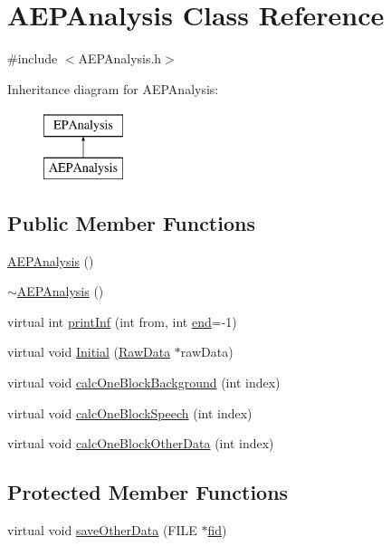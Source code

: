 \hypertarget{class_a_e_p_analysis}{\section{A\+E\+P\+Analysis Class Reference}
\label{class_a_e_p_analysis}
}


{\ttfamily \#include $<$A\+E\+P\+Analysis.\+h$>$}

Inheritance diagram for A\+E\+P\+Analysis\+:\begin{figure}[H]
\begin{center}
\leavevmode
\includegraphics[height=2.000000cm]{class_a_e_p_analysis}
\end{center}
\end{figure}
\subsection*{Public Member Functions}
\begin{DoxyCompactItemize}
\item 
\hyperlink{class_a_e_p_analysis_abfb2164f3ed7f023c2172b9bcf8b1e23}{A\+E\+P\+Analysis} ()
\item 
\hyperlink{class_a_e_p_analysis_a9bed164d77fe6f0acfdc941b361ea56a}{$\sim$\+A\+E\+P\+Analysis} ()
\item 
virtual int \hyperlink{class_a_e_p_analysis_a6349405c9185f6ce4e4d3c5711daa217}{print\+Inf} (int from, int \hyperlink{lpc2spec_8m_a75a3ccc1a712583b6c4b21b94514a7b9}{end}=-\/1)
\item 
virtual void \hyperlink{class_a_e_p_analysis_af8c0797c01e6d50d4e3f5e89f98863a3}{Initial} (\hyperlink{class_raw_data}{Raw\+Data} $\ast$raw\+Data)
\item 
virtual void \hyperlink{class_a_e_p_analysis_abdec61d75b30f2d6753c3c237e2b6805}{calc\+One\+Block\+Background} (int index)
\item 
virtual void \hyperlink{class_a_e_p_analysis_a367b638a878435cf86de9b4b384b61a0}{calc\+One\+Block\+Speech} (int index)
\item 
virtual void \hyperlink{class_a_e_p_analysis_a270d364445bb9ed0d82f2bc15791c046}{calc\+One\+Block\+Other\+Data} (int index)
\end{DoxyCompactItemize}
\subsection*{Protected Member Functions}
\begin{DoxyCompactItemize}
\item 
virtual void \hyperlink{class_a_e_p_analysis_a4c230992b22dd17f64614148698a3a17}{save\+Other\+Data} (F\+I\+L\+E $\ast$\hyperlink{readhtk_8m_ae135fff58330ebb77574e0dd6280aa68}{fid})
\end{DoxyCompactItemize}

